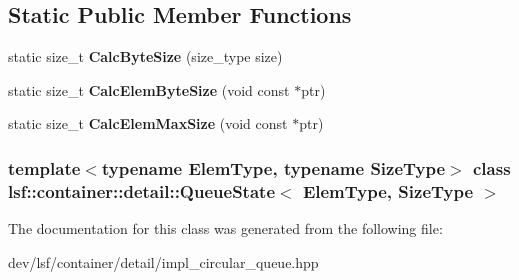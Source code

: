 \subsection*{Static Public Member Functions}
\begin{DoxyCompactItemize}
\item 
\hypertarget{classlsf_1_1container_1_1detail_1_1QueueState_a4e733fcdda98a3e90b22aec278e8bb09}{
static size\_\-t {\bfseries CalcByteSize} (size\_\-type size)}
\label{classlsf_1_1container_1_1detail_1_1QueueState_a4e733fcdda98a3e90b22aec278e8bb09}

\item 
\hypertarget{classlsf_1_1container_1_1detail_1_1QueueState_a0c177c47503fde2d2be8eda3da5fe295}{
static size\_\-t {\bfseries CalcElemByteSize} (void const $\ast$ptr)}
\label{classlsf_1_1container_1_1detail_1_1QueueState_a0c177c47503fde2d2be8eda3da5fe295}

\item 
\hypertarget{classlsf_1_1container_1_1detail_1_1QueueState_a2989fabcae9c034c30be3d053892925b}{
static size\_\-t {\bfseries CalcElemMaxSize} (void const $\ast$ptr)}
\label{classlsf_1_1container_1_1detail_1_1QueueState_a2989fabcae9c034c30be3d053892925b}

\end{DoxyCompactItemize}
\subsubsection*{template$<$typename ElemType, typename SizeType$>$ class lsf::container::detail::QueueState$<$ ElemType, SizeType $>$}



The documentation for this class was generated from the following file:\begin{DoxyCompactItemize}
\item 
dev/lsf/container/detail/impl\_\-circular\_\-queue.hpp\end{DoxyCompactItemize}
